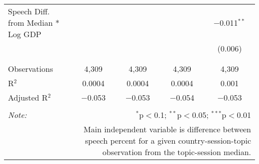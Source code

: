 \begin{table}[!htbp]
\begin{tabular}{@{\extracolsep{5pt}}lcccc}
 Speech Diff. from Median * Log GDP &  &  &  & $-$0.011$^{**}$ \\ 
  &  &  &  & (0.006) \\ 
  & & & & \\ 
\hline \\[-1.8ex] 
Observations & 4,309 & 4,309 & 4,309 & 4,309 \\ 
R$^{2}$ & 0.0004 & 0.0004 & 0.0004 & 0.001 \\ 
Adjusted R$^{2}$ & $-$0.053 & $-$0.053 & $-$0.054 & $-$0.053 \\ 
\hline 
\hline \\[-1.8ex] 
\textit{Note:}  & \multicolumn{4}{r}{$^{*}$p$<$0.1; $^{**}$p$<$0.05; $^{***}$p$<$0.01} \\ 
 & \multicolumn{4}{r}{Main independent variable is difference between speech percent for a given country-session-topic observation from the topic-session median.} \\ 
\end{tabular} 
\end{table} 
